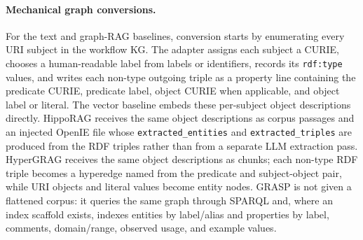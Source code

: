 \paragraph{Mechanical graph conversions.}
For the text and graph-RAG baselines, conversion starts by enumerating every URI
subject in the workflow KG\@. The adapter assigns each subject a CURIE, chooses a
human-readable label from labels or identifiers, records its \texttt{rdf:type}
values, and writes each non-type outgoing triple as a property line containing
the predicate CURIE, predicate label, object CURIE when applicable, and object
label or literal. The vector baseline embeds these per-subject object
descriptions directly. HippoRAG receives the same object descriptions as corpus
passages and an injected OpenIE file whose \texttt{extracted\_entities} and
\texttt{extracted\_triples} are produced from the RDF triples rather than from a
separate LLM extraction pass. HyperGRAG receives the same object descriptions as
chunks; each non-type RDF triple becomes a hyperedge named from the predicate
and subject-object pair, while URI objects and literal values become entity
nodes. GRASP is not given a flattened corpus: it queries the same graph through
SPARQL and, where an index scaffold exists, indexes entities by label/alias and
properties by label, comments, domain/range, observed usage, and example values.

